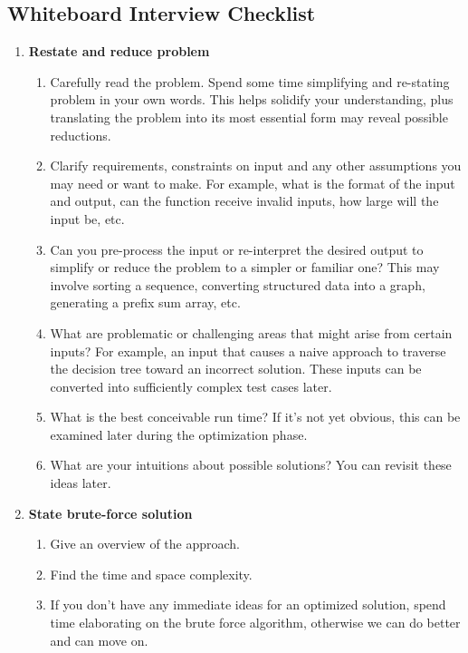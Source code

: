 \documentclass{article}
\begin{document}
\subsection{Whiteboard Interview Checklist}
\begin{enumerate}
    \item  \textbf{Restate and reduce problem}
    \begin{enumerate}
        \item Carefully read the problem. Spend some time simplifying and re-stating problem in your own words. This helps solidify your understanding, plus translating the problem into its most essential form may reveal possible reductions.
        \item Clarify requirements, constraints on input and any other assumptions you may need or want to make. For example, what is the format of the input and output, can the function receive invalid inputs, how large will the input be, etc.
        \item Can you pre-process the input or re-interpret the desired output to simplify or reduce the problem to a simpler or familiar one? This may involve sorting a sequence, converting structured data into a graph, generating a prefix sum array, etc.
        \item What are problematic or challenging areas that might arise from certain inputs? For example, an input that causes a naive approach to traverse the decision tree toward an incorrect solution. These inputs can be converted into sufficiently complex test cases later.
        \item What is the best conceivable run time? If it's not yet obvious, this can be examined later during the optimization phase.
        \item What are your intuitions about possible solutions? You can revisit these ideas later.
    \end{enumerate}
    
    \item \textbf{State brute-force solution}
    \begin{enumerate}
        \item Give an overview of the approach.
        \item Find the time and space complexity.
        \item If you don't have any immediate ideas for an optimized solution, spend time elaborating on the brute force algorithm, otherwise we can do better and can move on.
    \end{enumerate}
    

\end{enumerate}
\end{document}
